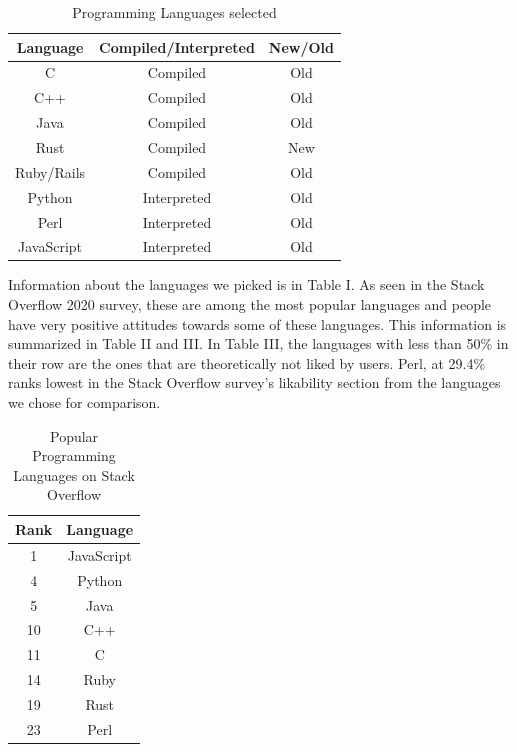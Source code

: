 \documentclass[conference]{IEEEtran}
\begin{document}
\begin{table}[htbp]
\caption{Programming Languages selected}
\begin{center}
\begin{tabular}{|c|c|c|}
\hline
\textbf{Language}&\textbf{Compiled/Interpreted}& \textbf{New/Old}\\
\hline
C&Compiled&Old\\
\hline
C++&Compiled&Old\\
\hline
Java&Compiled&Old\\
\hline
Rust&Compiled&New\\
\hline
Ruby/Rails&Compiled&Old\\
\hline
Python&Interpreted&Old\\
\hline
Perl&Interpreted&Old\\
\hline
JavaScript&Interpreted&Old\\
\hline
\end{tabular}
\label{tab1}
\end{center}
\end{table}

Information about the languages we picked is in Table I. As seen in the Stack Overflow 2020 survey\cite{b29}, these are among the most popular languages and people have very positive attitudes towards some of these languages. This information is summarized in Table II and III. In Table III, the languages with less than 50\% in their row are the ones that are theoretically not liked by users. Perl, at 29.4\% ranks lowest in the Stack Overflow survey's likability section from the languages we chose for comparison.\\

\begin{table}[htbp]
\caption{Popular Programming Languages on Stack Overflow}
\begin{center}
\begin{tabular}{|c|c|}
\hline
\textbf{Rank}&\textbf{Language}\\
\hline
1&JavaScript\\
\hline
4&Python\\
\hline
5&Java\\
\hline
10&C++\\
\hline
11&C\\
\hline
14&Ruby\\
\hline
19&Rust\\
\hline
23&Perl\\
\hline
\end{tabular}
\label{tab1}
\end{center}
\end{table}
\end{document}
